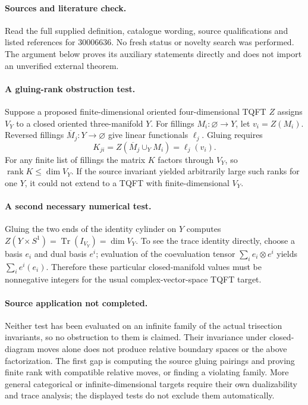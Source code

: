 \documentclass[11pt]{article}
\begin{document}
\paragraph{Sources and literature check.}
Read the full supplied definition, catalogue wording, source qualifications and listed references for 30006636. No fresh status or novelty search was performed. The argument below proves its auxiliary statements directly and does not import an unverified external theorem.

\paragraph{A gluing-rank obstruction test.} Suppose a proposed finite-dimensional oriented four-dimensional TQFT \(Z\) assigns \(V_Y\) to a closed oriented three-manifold \(Y\). For fillings \(M_i:\varnothing\to Y\), let \(v_i=Z(M_i)\). Reversed fillings \(\overline M_j:Y\to\varnothing\) give linear functionals \(\ell_j\). Gluing requires
\[
 K_{ji}=Z(\overline M_j\cup_Y M_i)=\ell_j(v_i).
\]
For any finite list of fillings the matrix \(K\) factors through \(V_Y\), so \(\operatorname{rank}K\leq\dim V_Y\). If the source invariant yielded arbitrarily large such ranks for one \(Y\), it could not extend to a TQFT with finite-dimensional \(V_Y\).
\paragraph{A second necessary numerical test.} Gluing the two ends of the identity cylinder on \(Y\) computes \(Z(Y\times S^1)=\operatorname{Tr}(I_{V_Y})=\dim V_Y\). To see the trace identity directly, choose a basis \(e_i\) and dual basis \(e^i\); evaluation of the coevaluation tensor \(\sum_i e_i\otimes e^i\) yields \(\sum_i e^i(e_i)\). Therefore these particular closed-manifold values must be nonnegative integers for the usual complex-vector-space TQFT target.
\paragraph{Source application not completed.} Neither test has been evaluated on an infinite family of the actual trisection invariants, so no obstruction to them is claimed. Their invariance under closed-diagram moves alone does not produce relative boundary spaces or the above factorization. The first gap is computing the source gluing pairings and proving finite rank with compatible relative moves, or finding a violating family. More general categorical or infinite-dimensional targets require their own dualizability and trace analysis; the displayed tests do not exclude them automatically.
\end{document}
